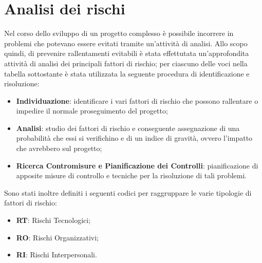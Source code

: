 \section{Analisi dei rischi}
Nel corso dello sviluppo di un progetto complesso è possibile incorrere in problemi che potevano essere evitati tramite un'attività di analisi. Allo scopo quindi, di prevenire rallentamenti evitabili è stata effettutata un'approfondita attività di analisi dei principali fattori di rischio; per ciascuno delle voci nella tabella sottostante è stata utilizzata la seguente procedura di identificazione e risoluzione:
\begin{itemize}
	\item \textbf{Individuazione}: identificare i vari fattori di rischio che possono rallentare o impedire il normale proseguimento del progetto;
	\item \textbf{Analisi}: studio dei fattori di rischio e conseguente assegnazione di una probabilità che essi si verifichino e di un indice di gravità, ovvero l'impatto che avrebbero sul progetto;
	\item \textbf{Ricerca Contromisure e Pianificazione dei Controlli}: pianificazione di apposite misure di controllo e tecniche per la risoluzione di tali problemi.
\end{itemize}
Sono stati inoltre definiti i seguenti codici per raggruppare le varie tipologie di fattori di rischio:
\begin{itemize}
	\item \textbf{RT}: Rischi Tecnologici;
	\item \textbf{RO}: Rischi Organizzativi;
	\item \textbf{RI}: Rischi Interpersonali.
\end{itemize}
